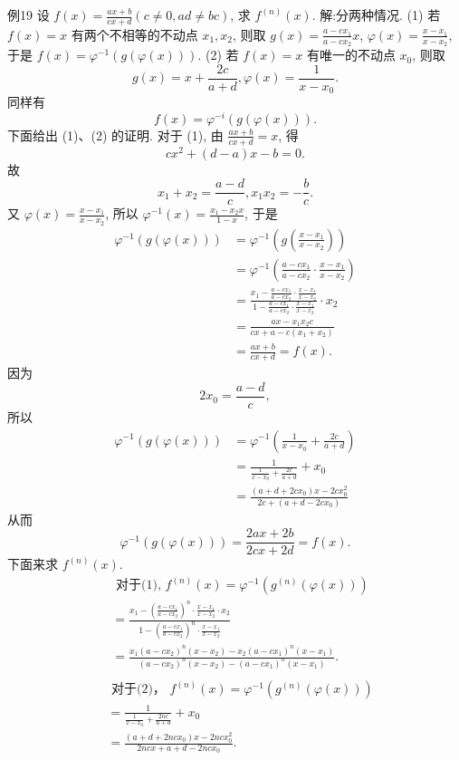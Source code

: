 例19 设 $f(x)=\frac{a x+b}{c x+d}(c \neq 0, a d \neq b c)$, 求 $f^{(n)}(x)$.
解:分两种情况.
(1) 若 $f(x)=x$ 有两个不相等的不动点 $x_1, x_2$, 则取 $g(x)=\frac{a-c x_1}{a-c x_2} x$, $\varphi(x)=\frac{x-x_1}{x-x_2}$, 于是 $f(x)=\varphi^{-1}(g(\varphi(x)))$.
(2) 若 $f(x)=x$ 有唯一的不动点 $x_0$, 则取
$$
g(x)=x+\frac{2 c}{a+d}, \varphi(x)=\frac{1}{x-x_0} .
$$
同样有
$$
f(x)=\varphi^{-i}(g(\varphi(x))) .
$$
下面给出 (1)、(2) 的证明.
对于 (1), 由 $\frac{a x+b}{c x+d}=x$, 得
$$
c x^2+(d-a) x-b=0 .
$$
故
$$
x_1+x_2=\frac{a-d}{c}, x_1 x_2=-\frac{b}{c} .
$$
又 $\varphi(x)=\frac{x-x_1}{x-x_2}$, 所以 $\varphi^{-1}(x)=\frac{x_1-x_2 x}{1-x}$, 于是
$$
\begin{aligned}
\varphi^{-1}(g(\varphi(x))) & =\varphi^{-1}\left(g\left(\frac{x-x_1}{x-x_2}\right)\right) \\
& =\varphi^{-1}\left(\frac{a-c x_1}{a-c x_2} \cdot \frac{x-x_1}{x-x_2}\right) \\
& =\frac{x_1-\frac{a-c x_1}{a-c x_2} \cdot \frac{x-x_1}{x-x_2}}{1-\frac{a-c x_1}{a-c x_2} \cdot \frac{x-x_1}{x-x_2}} \cdot x_2 \\
& =\frac{a x-x_1 x_2 c}{c x+a-c\left(x_1+x_2\right)} \\
& =\frac{a x+b}{c x+d}=f(x) .
\end{aligned}
$$
因为
$$
2 x_0=\frac{a-d}{c},
$$
所以
$$
\begin{aligned}
\varphi^{-1}(g(\varphi(x))) & =\varphi^{-1}\left(\frac{1}{x-x_0}+\frac{2 c}{a+d}\right) \\
& =\frac{1}{\frac{1}{x-x_0}+\frac{2 c}{a+d}}+x_0 \\
& =\frac{\left(a+d+2 c x_0\right) x-2 c x_0^2}{2 c+\left(a+d-2 c x_0\right)}
\end{aligned}
$$
从而
$$
\varphi^{-1}(g(\varphi(x)))=\frac{2 a x+2 b}{2 c x+2 d}=f(x) .
$$
下面来求 $f^{(n)}(x)$.
$$
\begin{aligned}
& \text { 对于(1),  }f^{(n)}(x)=\varphi^{-1}\left(g^{(n)}(\varphi(x))\right) \\
& =\frac{x_1-\left(\frac{a-c x_1}{a-c x_2}\right)^n \cdot \frac{x-x_1}{x-x_2} \cdot x_2}{1-\left(\frac{a-c x_1}{a-c x_2}\right)^n \cdot \frac{x-x_1}{x-x_2}} \\
& =\frac{x_1\left(a-c x_2\right)^n\left(x-x_2\right)-x_2\left(a-c x_1\right)^n\left(x-x_1\right)}{\left(a-c x_2\right)^n\left(x-x_2\right)-\left(a-c x_1\right)^n\left(x-x_1\right)} \text {. } \\
\end{aligned}
$$
$$
\begin{aligned}
& \text { 对于(2)， }  f^{(n)}(x)=\varphi^{-1}\left(g^{(n)}(\varphi(x))\right) \\
& =\frac{1}{\frac{1}{x-x_0}+\frac{2 n c}{a+d}}+x_0 \\
& =\frac{\left(a+d+2 n c x_0\right) x-2 n c x_0^2}{2 n c x+a+d-2 n c x_0} .\\
\end{aligned}
$$



